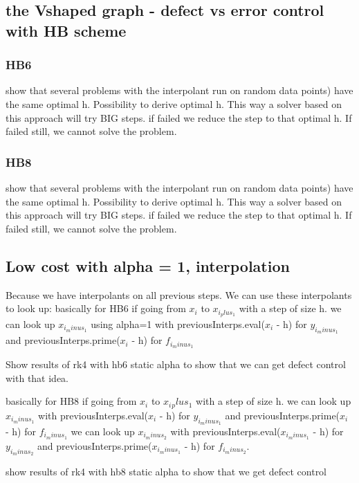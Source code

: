 \documentclass{article}
\begin{document}
\subsection{the Vshaped graph - defect vs error control with HB scheme}
\label{section:v_shaped_graph}

\subsubsection{HB6}
show that several problems with the interpolant run on random data points) have the same optimal h. 
Possibility to derive optimal h. This way a solver based on this approach will try BIG steps. if failed we reduce the step to that optimal h. If failed still, we cannot solve the problem.

\subsubsection{HB8}
show that several problems with the interpolant run on random data points) have the same optimal h. 
Possibility to derive optimal h. This way a solver based on this approach will try BIG steps. if failed we reduce the step to that optimal h. If failed still, we cannot solve the problem.

\subsection{Low cost with alpha = 1, interpolation}
\label{section:keeping_alpha_at_1}
Because we have interpolants on all previous steps. We can use these interpolants to look up:
basically for HB6
	if going from $x_i$ to $x_{i_plus_1}$ with a step of size h.
	we can look up $x_{i_minus_1}$ using alpha=1 with previousInterps.eval($x_i$ - h) for $y_{i_minus_1}$ and previousInterps.prime($x_i$ - h) for $f_{i_minus_1}$
	
Show results of rk4 with hb6 static alpha to show that we can get defect control with that idea.

basically for HB8
		if going from $x_i$ to $x_i{_plus_1}$ with a step of size h.
	we can look up $x_{i_minus_1}$ with previousInterps.eval($x_i$ - h) for $y_{i_minus_1}$ and previousInterps.prime($x_i$ - h) for $f_{i_minus_1}$
	we can look up $x_{i_minus_2}$ with previousInterps.eval($x_{i_minus_1}$ - h) for $y_{i_minus_2}$ and previousInterps.prime($x_{i_minus_1}$ - h) for $f_{i_minus_2}$.
	
show results of rk4 with hb8 static alpha to show that we get defect control
	
\end{document}
